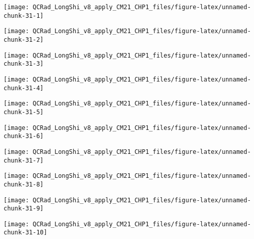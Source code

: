 \documentclass[
  10pt,
  a4paper,oneside]{article}
\begin{document}
\begin{center}\texttt{[image: QCRad\_LongShi\_v8\_apply\_CM21\_CHP1\_files/figure-latex/unnamed-chunk-31-1]} \end{center}

\begin{center}\texttt{[image: QCRad\_LongShi\_v8\_apply\_CM21\_CHP1\_files/figure-latex/unnamed-chunk-31-2]} \end{center}

\begin{center}\texttt{[image: QCRad\_LongShi\_v8\_apply\_CM21\_CHP1\_files/figure-latex/unnamed-chunk-31-3]} \end{center}

\begin{center}\texttt{[image: QCRad\_LongShi\_v8\_apply\_CM21\_CHP1\_files/figure-latex/unnamed-chunk-31-4]} \end{center}

\begin{center}\texttt{[image: QCRad\_LongShi\_v8\_apply\_CM21\_CHP1\_files/figure-latex/unnamed-chunk-31-5]} \end{center}

\begin{center}\texttt{[image: QCRad\_LongShi\_v8\_apply\_CM21\_CHP1\_files/figure-latex/unnamed-chunk-31-6]} \end{center}

\begin{center}\texttt{[image: QCRad\_LongShi\_v8\_apply\_CM21\_CHP1\_files/figure-latex/unnamed-chunk-31-7]} \end{center}

\begin{center}\texttt{[image: QCRad\_LongShi\_v8\_apply\_CM21\_CHP1\_files/figure-latex/unnamed-chunk-31-8]} \end{center}

\begin{center}\texttt{[image: QCRad\_LongShi\_v8\_apply\_CM21\_CHP1\_files/figure-latex/unnamed-chunk-31-9]} \end{center}

\begin{center}\texttt{[image: QCRad\_LongShi\_v8\_apply\_CM21\_CHP1\_files/figure-latex/unnamed-chunk-31-10]} \end{center}
\end{document}
